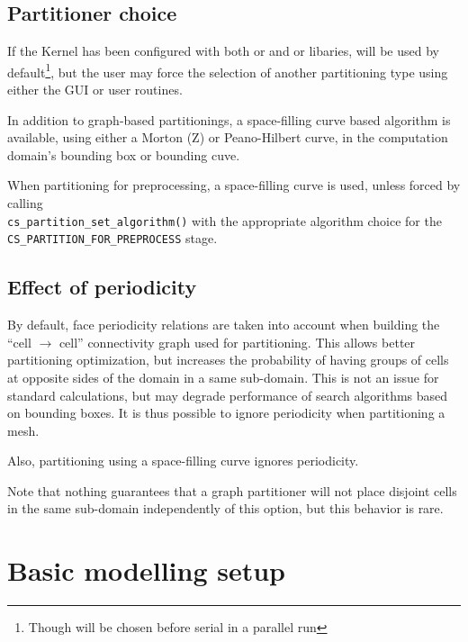{{\subsection{Partitioner choice\label{sec:parall:part:partlib}}

If the Kernel has been configured with both \ptscotch or \scotch and
\parmetis or \metis libaries, \ptscotch will be used by default\footnote{
Though \parmetis will be chosen before serial \scotch in a parallel
run}, but the user may force the selection of another partitioning
type using either the GUI or user routines.

In addition to graph-based partitionings, a space-filling curve based
algorithm is available, using either a Morton (Z) or Peano-Hilbert
curve, in the computation domain's bounding box or bounding cuve.

When partitioning for preprocessing, a space-filling curve is used,
unless forced by calling\\ \texttt{cs\_partition\_set\_algorithm()}
with the appropriate algorithm choice for the\\
\texttt{CS\_PARTITION\_FOR\_PREPROCESS} stage.

\subsection{Effect of periodicity\label{sec:parall:part:noperiod}}

By default, face periodicity relations are taken into account when building
the ``cell $\rightarrow$ cell'' connectivity graph used for partitioning.
This allows better partitioning optimization, but increases the probability
of having groups of cells at opposite sides of the domain in a same
sub-domain. This is not an issue for standard calculations, but may
degrade performance of search algorithms based on bounding boxes.
It is thus possible to ignore periodicity when partitioning a mesh.

Also, partitioning using a space-filling curve ignores periodicity.

Note that nothing guarantees that a graph partitioner will not place
disjoint cells in the same sub-domain independently of this option,
but this behavior is rare.

\section{Basic modelling setup}

}}
